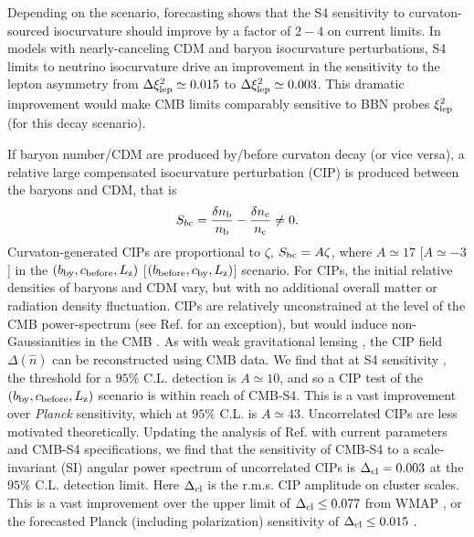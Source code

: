 Depending on the scenario, forecasting shows that the S4 sensitivity to curvaton-sourced isocurvature should improve by a factor of $2-4$ on current limits. In models with nearly-canceling CDM and baryon isocurvature perturbations, S4 limits to neutrino isocurvature drive an improvement in the sensitivity to the lepton asymmetry from $\Delta \xi_{\rm lep}^{2}\simeq 0.015$ to $\Delta \xi_{\rm lep}^{2}\simeq 0.003$. This dramatic improvement would make CMB limits comparably sensitive to BBN probes $\xi_{\rm lep}^{2}$ (for this decay scenario).

If baryon number/CDM are produced by/before curvaton decay (or vice versa), a relative large compensated isocurvature perturbation (CIP) is produced between the baryons and CDM, that is
\begin{equation}
S_{bc}=\frac{\delta n_{\rm b}}{n_{\rm b}}-\frac{\delta n_{\rm c}}{n_{\rm c}}\neq 0.
\end{equation} Curvaton-generated CIPs are proportional to $\zeta$, $S_{\rm bc}=A\zeta$, where $A\simeq 17$ [$A\simeq -3$] in the $(b_{\rm by}, c_{\rm before}, L_{\rm z})$ [$(b_{\rm before}, c_{\rm by}, L_{\rm z})$] scenario. For CIPs, the initial relative densities of baryons and CDM vary, but with no additional overall matter or radiation density fluctuation.
CIPs are relatively unconstrained at the level of the CMB power-spectrum (see Ref. \cite{Munoz:2015fdv} for an exception), but would induce non-Gaussianities in the CMB \cite{Grin:2011nk,Grin:2011tf,Grin:2013uya,He:2015msa}. As with weak gravitational lensing \cite{Hu:2001kj}, the CIP field $\Delta(\hat{n})$ can be reconstructed using CMB data. We find that at S4 sensitivity \cite{He:2015msa}, the threshold for a $95\%$ C.L. detection is $A\simeq 10$, and so a CIP test of the $(b_{\rm by}, c_{\rm before}, L_{\rm z})$ scenario is within reach of CMB-S4. This is a vast improvement over \emph{Planck} sensitivity, which at $95\%$ C.L. is $A\simeq 43$. Uncorrelated CIPs are less  motivated theoretically. Updating the analysis of Ref. \cite{He:2015msa} with current parameters \cite{Ade:2015lrj} and CMB-S4 specifications, we find that the sensitivity of CMB-S4 to a scale-invariant (SI) angular power spectrum of uncorrelated CIPs is $\Delta_{\rm cl}=0.003$ at the $95\%$ C.L. detection limit. Here $\Delta_{\rm cl}$ is the r.m.s. CIP amplitude on cluster scales. This is a vast improvement over the upper limit of $\Delta_{\rm cl}\leq 0.077$ from WMAP \cite{Grin:2013uya}, or the forecasted Planck \cite{Ade:2015lrj} (including polarization) sensitivity of $\Delta_{\rm cl}\leq 0.015$ \cite{He:2015msa}.

